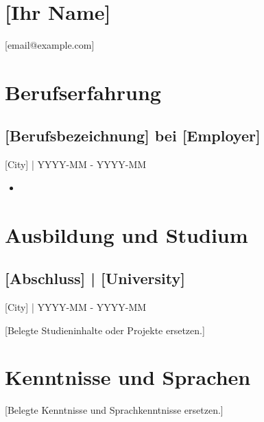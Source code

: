 \documentclass[11pt,a4paper]{article}
\begin{document}
\section*{[Ihr Name]}
[email@example.com]\par
[Phone / Telefon]\par
\section*{Berufserfahrung}
\subsection*{[Berufsbezeichnung] bei [Employer]}
[City] | YYYY-MM - YYYY-MM\par
\begin{itemize}
\item [Belegte Aufgabe oder Leistung ersetzen.]
\end{itemize}
\section*{Ausbildung und Studium}
\subsection*{[Abschluss] | [University]}
[City] | YYYY-MM - YYYY-MM\par
[Belegte Studieninhalte oder Projekte ersetzen.]\par
\section*{Kenntnisse und Sprachen}
[Belegte Kenntnisse und Sprachkenntnisse ersetzen.]\par
\end{document}
